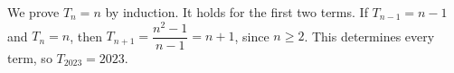 We prove $T_n=n$ by induction. It holds for the first two terms. If $T_{n-1}=n-1$ and $T_n=n$, then $T_{n+1}=\dfrac{n^2-1}{n-1}=n+1$, since $n\ge2$. This determines every term, so $\boxed{T_{2023}=2023}$.

